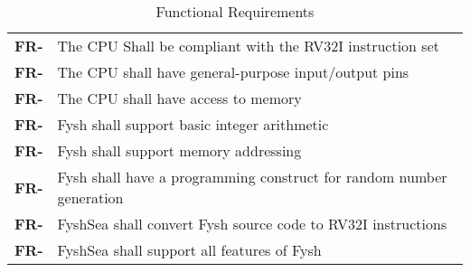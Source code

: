 \resetfyshcounter
\newcommand{\fr}[1]{%
	\textbf{FR-\rc} & #1 \\%
	\hline%
}
\begin{table}[H]
	\begin{tabularx}{\textwidth}{| a | x |}
		\hline
		 &  \\
		\hline
		\fr{The CPU Shall be compliant with the RV32I instruction set}
		\fr{The CPU shall have general-purpose input/output pins}
		\fr{The CPU shall have access to memory}
		\fr{Fysh shall support basic integer arithmetic}
		\fr{Fysh shall support memory addressing}
		\fr{Fysh shall have a programming construct for random number generation}
		\fr{FyshSea shall convert Fysh source code to RV32I instructions}
		\fr{FyshSea shall support all features of Fysh}
	\end{tabularx}
	\caption{Functional Requirements}
\end{table}

